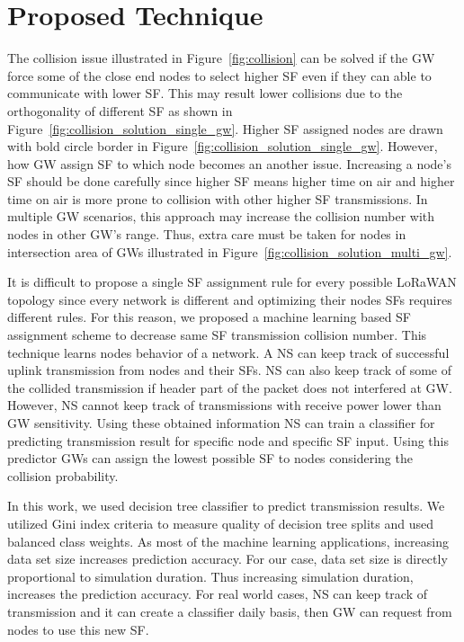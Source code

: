 \documentclass[conference]{IEEEtran}
\begin{document}
\section{Proposed Technique} \label{Proposed Technique}
\par The collision issue illustrated in Figure~\ref{fig:collision} can be solved if the GW force some of the close end nodes to select higher SF even if they can able to communicate with lower SF. This may result lower collisions due to the orthogonality of different SF as shown in Figure~\ref{fig:collision_solution_single_gw}. Higher SF assigned nodes are drawn with bold circle border in Figure~\ref{fig:collision_solution_single_gw}. However, how GW assign SF to which node becomes an another issue. Increasing a node's SF should be done carefully since higher SF means higher time on air and higher time on air is more prone to collision with other higher SF transmissions. In multiple GW scenarios, this approach may increase the collision number with nodes in other GW's range. Thus, extra care must be taken for nodes in intersection area of GWs illustrated in Figure~\ref{fig:collision_solution_multi_gw}.

\par It is difficult to propose a single SF assignment rule for every possible LoRaWAN topology since every network is different and optimizing their nodes SFs requires different rules. For this reason, we proposed a machine learning based SF assignment scheme to decrease same SF transmission collision number.  This technique learns nodes behavior of a network. A NS can keep track of successful uplink transmission from nodes and their SFs. NS can also keep track of some of the collided transmission if header part of the packet does not interfered at GW. However, NS cannot keep track of transmissions with receive power lower than GW sensitivity. Using these obtained information NS can train a classifier for predicting transmission result for specific node and specific SF input. Using this predictor GWs can assign the lowest possible SF to nodes considering the collision probability.

\par In this work, we used decision tree classifier to predict transmission results. We utilized Gini index criteria to measure quality of decision tree splits and used balanced class weights. As most of the machine learning applications, increasing data set size increases prediction accuracy. For our case, data set size is directly proportional to simulation duration. Thus increasing simulation duration, increases the prediction accuracy. For real world cases, NS can keep track of transmission and it can create a classifier daily basis, then GW can request from nodes to use this new SF.
\end{document}
